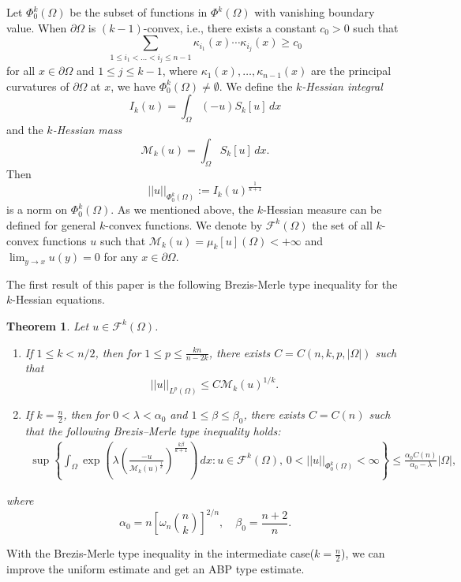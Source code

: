 \documentclass[11pt]{amsart}
\numberwithin{equation}{section}
\newtheorem{theorem}{Theorem}[section]
\numberwithin{equation}{section}
\begin{document}
Let $\Phi^k_0(\Omega)$ be the subset of functions in $\Phi^k(\Omega)$ with vanishing boundary value.
When $\partial \Omega$ is $(k-1)$-convex, i.e., there exists a constant $c_0>0$ such that
\[
\sum_{1\le i_1<\dots<i_j\le n-1}\kappa_{i_1}(x)\cdots \kappa_{i_j}(x)\ge c_0
\]
for all $x\in\partial\Omega$ and $1\le j\le k-1$, where $\kappa_1(x),\dots,\kappa_{n-1}(x)$ are the principal curvatures of $\partial\Omega$ at $x$, we have $\Phi^k_0(\Omega)\neq\emptyset$.
We define the {\it $k$-Hessian integral}
\[I_k(u)=\int_{\Omega}(-u)S_k[u]\,dx\]
and the {\it $k$-Hessian mass}
\[\mathcal M_k(u)=\int_{\Omega}S_k[u]\,dx.\]
Then 
\[||u||_{\Phi^k_0(\Omega)}:=I_k(u)^{\frac{1}{k+1}}\] 
is a norm on $\Phi^k_0(\Omega)$.  As we mentioned above, the $k$-Hessian measure can be defined for 
general $k$-convex functions. We denote by $\mathcal F^k(\Omega)$ the set of all $k$-convex functions $u$
such that $\mathcal M_k(u)=\mu_k[u](\Omega)<+\infty$ and $\displaystyle\lim_{y\to x}u(y)=0$ for any $x\in\partial\Omega$.

The first result of this paper is the following Brezis-Merle type inequality for the $k$-Hessian equations.

\begin{theorem}\label{thm BM inequality} Let $u\in \mathcal F^k(\Omega)$.
\begin{enumerate}
\item [(1)] If  $1\leq k<n/2$, then for $1\leq p \leq \frac{kn}{n-2k}$, there exists $C=C(n, k, p, |\Omega|)$ such that
\[ ||u ||_{L^p(\Omega)}\leq  C\mathcal M_k(u)^{1/k}.\]

\item [(2)] If $k = \frac{n}{2}$, then for $0 < \lambda < \alpha_0$ and $1 \leq \beta \leq \beta_0$, there exists $C=C(n)$ such that the following Brezis--Merle type inequality holds:
\begin{align}
\sup\left\{\int_{\Omega}\exp\left(\lambda\left(\frac{-u}{\mathcal{M}_{k}(u)^{\frac{1}{k}}}\right)^{\frac{k\beta}{k+1}}\right)\,dx: u\in \mathcal F^k(\Omega),\,0<||u||_{\Phi_0^k(\Omega)}<\infty\right\}\leq \frac{\alpha_0C(n) }{\alpha_0-\lambda}|\Omega|,
\end{align}
\end{enumerate}
where
\begin{equation}\label{apbe}
\alpha_0 = n \left[ \omega_{n} \binom{n}{k} \right]^{2/n}, \quad 
\beta_0 = \frac{n+2}{n}.
\end{equation}
\end{theorem}

With the Brezis-Merle type inequality in the intermediate case($k=\frac{n}{2}$), we can improve the uniform estimate and get an ABP type estimate.
\end{document}
